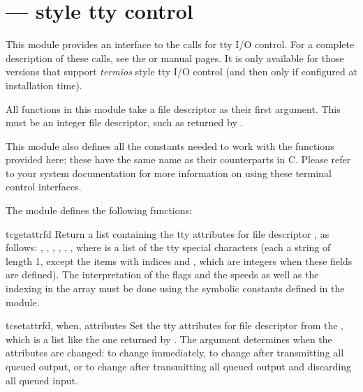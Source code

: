 \section{ ---
         \POSIX{} style tty control}




This module provides an interface to the \POSIX{} calls for tty I/O
control.  For a complete description of these calls, see the \POSIX{} or
\UNIX{} manual pages.  It is only available for those \UNIX{} versions
that support \POSIX{} \emph{termios} style tty I/O control (and then
only if configured at installation time).

All functions in this module take a file descriptor  as their
first argument.  This must be an integer file descriptor, such as
returned by .

This module also defines all the constants needed to work with the
functions provided here; these have the same name as their
counterparts in C.  Please refer to your system documentation for more
information on using these terminal control interfaces.

The module defines the following functions:

\begin{funcdesc}{tcgetattr}{fd}
Return a list containing the tty attributes for file descriptor
, as follows: \code{[}, , ,
, , , \code{]} where
 is a list of the tty special characters (each a string of
length 1, except the items with indices  and
, which are integers when these fields are
defined).  The interpretation of the flags and the speeds as well as
the indexing in the  array must be done using the symbolic
constants defined in the 
module.
\end{funcdesc}

\begin{funcdesc}{tcsetattr}{fd, when, attributes}
Set the tty attributes for file descriptor  from the
, which is a list like the one returned by
.  The  argument determines when the
attributes are changed:  to change immediately,
 to change after transmitting all queued output,
or  to change after transmitting all queued
output and discarding all queued input.
\end{funcdesc}

